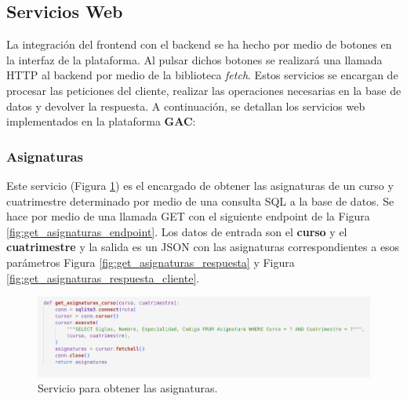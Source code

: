 \subsection{Servicios Web}

La integración del frontend con el backend se ha hecho por medio de botones en la interfaz de la plataforma. Al pulsar dichos botones se realizará una llamada HTTP al backend por medio de la biblioteca \textit{fetch}. Estos servicios se encargan de procesar las peticiones del cliente, realizar las operaciones necesarias en la base de datos y devolver la respuesta. A continuación, se detallan los servicios web implementados en la plataforma \textbf{GAC}:

\subsubsection*{Asignaturas}

Este servicio (Figura \ref{fig:get_asignaturas_curso}) es el encargado de obtener las asignaturas de un curso y cuatrimestre determinado por medio de una consulta SQL a la base de datos. Se hace por medio de una llamada GET con el siguiente endpoint de la Figura \ref{fig:get_asignaturas_endpoint}. Los datos de entrada son el \textbf{curso} y el \textbf{cuatrimestre} y la salida es un JSON con las asignaturas correspondientes a esos parámetros Figura \ref{fig:get_asignaturas_respuesta} y Figura \ref{fig:get_asignaturas_respuesta_cliente}.

\begin{figure}[H]
    \centering
    \includegraphics[width=1\textwidth]{./imagenes/get_asignaturas_curso.png}
    \caption{Servicio para obtener las asignaturas.}
    \label{fig:get_asignaturas_curso}
\end{figure}


